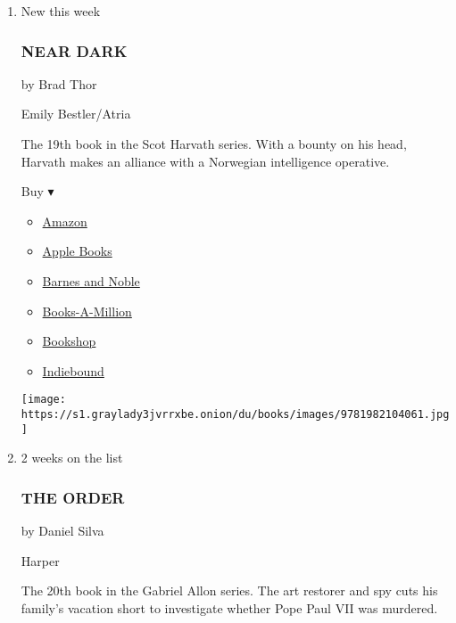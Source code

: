 \begin{enumerate}
\def\labelenumi{\arabic{enumi}.}
\item
  New this week

  \hypertarget{near-dark}{%
  \subsubsection{NEAR DARK}\label{near-dark}}

  by Brad Thor

  Emily Bestler/Atria

  The 19th book in the Scot Harvath series. With a bounty on his head,
  Harvath makes an alliance with a Norwegian intelligence operative.

  Buy ▾

  \begin{itemize}
  \tightlist
  \item
    \href{https://www.amazon.com/dp/1982104066?tag=NYTBSREV-20\&tag=NYTBS-20}{Amazon}
  \item
    \href{https://du-gae-books-dot-nyt-du-prd.appspot.com/buy?title=NEAR+DARK\&author=Brad+Thor}{Apple
    Books}
  \item
    \href{https://www.anrdoezrs.net/click-7990613-11819508?url=https\%3A\%2F\%2Fwww.barnesandnoble.com\%2Fw\%2F\%3Fean\%3D9781982104085}{Barnes
    and Noble}
  \item
    \href{https://www.anrdoezrs.net/click-7990613-35140?url=https\%3A\%2F\%2Fwww.booksamillion.com\%2Fp\%2FNEAR\%2BDARK\%2FBrad\%2BThor\%2F9781982104085}{Books-A-Million}
  \item
    \href{https://bookshop.org/a/3546/9781982104085}{Bookshop}
  \item
    \href{https://www.indiebound.org/book/9781982104085?aff=NYT}{Indiebound}
  \end{itemize}

  \texttt{[image: https://s1.graylady3jvrrxbe.onion/du/books/images/9781982104061.jpg]}
\item
  2 weeks on the list

  \hypertarget{the-order}{%
  \subsubsection{THE ORDER}\label{the-order}}

  by Daniel Silva

  Harper

  The 20th book in the Gabriel Allon series. The art restorer and spy
  cuts his family's vacation short to investigate whether Pope Paul VII
  was murdered.


\end{enumerate}
